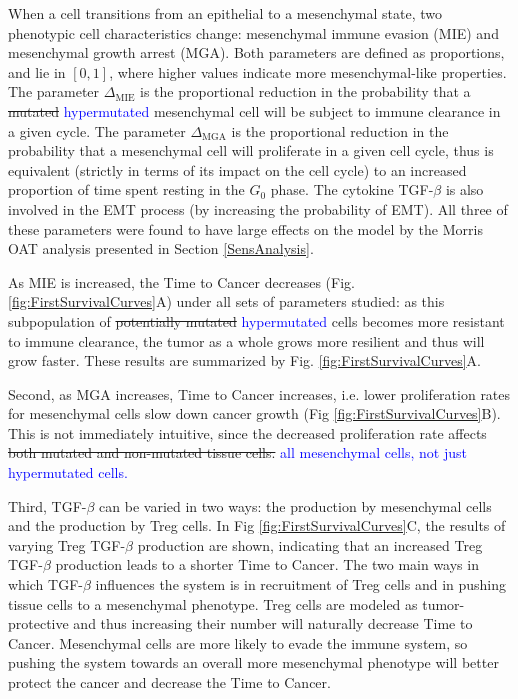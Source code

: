 \documentclass[11pt]{article}
\newcommand{\tcb} { \textcolor{blue} }
\begin{document}
When a cell transitions from an epithelial to a mesenchymal state, two phenotypic cell characteristics change: mesenchymal immune evasion (MIE) and mesenchymal growth arrest (MGA).
Both parameters are defined as proportions, and lie in $[0,1]$, where higher values indicate more mesenchymal-like properties.
The parameter $\Delta_\text{MIE}$ is the proportional reduction in the probability that a \sout{mutated} \tcb{hypermutated} mesenchymal cell will be subject to immune clearance in a given cycle.
The parameter $\Delta_\text{MGA}$ is the proportional reduction in the probability that a mesenchymal cell will proliferate in a given cell cycle, thus is equivalent (strictly in terms of its impact on the cell cycle) to an increased proportion of time spent resting in the $G_0$ phase.
The cytokine TGF-$\beta$ is also involved in the EMT process (by increasing the probability of EMT). All three of these parameters were found to have large effects on the model by the Morris OAT analysis presented in Section \ref{SensAnalysis}.
\par 
As MIE is increased, the Time to Cancer decreases (Fig. \ref{fig:FirstSurvivalCurves}A) under all sets of parameters studied: as this subpopulation of \sout{potentially mutated} \tcb{hypermutated} cells becomes more resistant to immune clearance, the tumor as a whole grows more resilient and thus will grow faster.
These results are summarized by Fig. \ref{fig:FirstSurvivalCurves}A.
\par
Second, as MGA increases, Time to Cancer increases, i.e. lower proliferation rates for mesenchymal cells slow down cancer growth (Fig \ref{fig:FirstSurvivalCurves}B).
This is not immediately intuitive, since the decreased proliferation rate affects \sout{both mutated and non-mutated tissue cells.} \tcb{all mesenchymal cells, not just hypermutated cells.}
\par
Third, TGF-$\beta$ can be varied in two ways: the production by mesenchymal cells and the production by Treg cells.
In Fig \ref{fig:FirstSurvivalCurves}C, the results of varying Treg TGF-$\beta$ production are shown, indicating that an increased Treg TGF-$\beta$ production leads to a shorter Time to Cancer.
The two main ways in which TGF-$\beta$ influences the system is in recruitment of Treg cells and in pushing tissue cells to a mesenchymal phenotype.
Treg cells are modeled as tumor-protective and thus increasing their number will naturally decrease Time to Cancer.
Mesenchymal cells are more likely to evade the immune system, so pushing the system towards an overall more mesenchymal phenotype will better protect the cancer and decrease the Time to Cancer.
\end{document}
